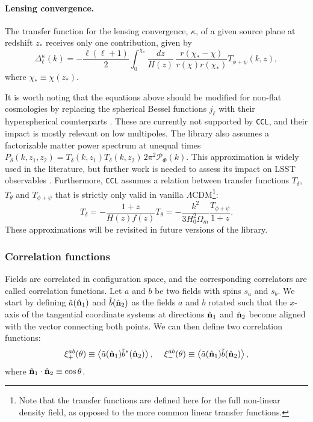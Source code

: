 \documentclass[\docopts]{\docclass}
\newcommand{\nv}{\hat{\bf n}}
\newcommand{\ccl}{{\tt CCL}\xspace}
\begin{document}
\paragraph{\bf Lensing convergence.} The transfer function for the lensing convergence, $\kappa$, of a given source plane at redshift $z_*$ receives only one contribution, given by
\begin{equation}
  \Delta_\ell^\kappa(k)=-\frac{\ell(\ell+1)}{2}\int_0^{\chi_*}\frac{dz}{H(z)}\,\frac{r(\chi_*-\chi)}{r(\chi)r(\chi_*)}T_{\phi+\psi}(k,z),
  \label{eq:cmblens}
\end{equation}
where $\chi_*\equiv\chi(z_*)$.

\noindent
It is worth noting that the equations above should be modified for non-flat cosmologies by replacing the spherical Bessel functions $j_\ell$ with their hyperspherical counterparts \citep{1994ApJ...432....7K}. These are currently not supported by \ccl, and their impact is mostly relevant on low multipoles. The library also assumes a factorizable matter power spectrum at unequal times $P_\delta(k,z_1,z_2)=T_\delta(k,z_1)T_\delta(k,z_2)\,2\pi^2\mathcal{P}_\Phi(k)$. This approximation is widely used in the literature, but further work is needed to assess its impact on LSST observables \citep{2017PhRvD..95f3522K}. Furthermore, \ccl assumes a relation between transfer functions $T_\delta$, $T_\theta$ and $T_{\phi+\psi}$ that is strictly only valid in vanilla $\Lambda$CDM\footnote{Note that the transfer functions are defined here for the full non-linear density field, as opposed to the more common linear transfer functions.}:
\begin{equation}
  T_\delta=-\frac{1+z}{H(z)f(z)}T_\theta=-\frac{k^2}{3H_0^2\Omega_m}\frac{T_{\phi+\psi}}{1+z}.
\end{equation}
These approximations will be revisited in future versions of the library.


\subsubsection{Correlation functions}

Fields are correlated in configuration space, and the corresponding correlators are called correlation functions. Let $a$ and $b$ be two fields with spins $s_a$ and $s_b$. We start by defining $\tilde{a}(\nv_1)$ and $\tilde{b}(\nv_2)$ as the fields $a$ and $b$ rotated such that the $x$-axis of the tangential coordinate systems at directions $\nv_1$ and $\nv_2$ become aligned with the vector connecting both points. We can then define two correlation functions:
\begin{equation}\nonumber
  \xi^{ab}_+(\theta)\equiv\left\langle\tilde{a}(\nv_1)\tilde{b}^*(\nv_2)\right\rangle,\hspace{12pt}
  \xi^{ab}_-(\theta)\equiv\left\langle\tilde{a}(\nv_1)\tilde{b}(\nv_2)\right\rangle,
  \label{eq:xipm}
\end{equation}
where $\nv_1\cdot\nv_2\equiv\cos\theta$. 
\end{document}
